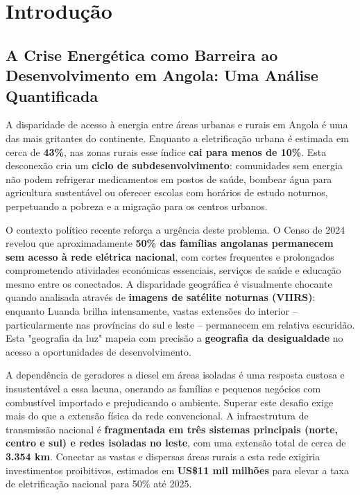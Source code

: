 \documentclass[12pt, a4paper]{article}
\begin{document}
\newpage

\tableofcontents
\newpage

\section{Introdução}

\subsection{A Crise Energética como Barreira ao Desenvolvimento em Angola: Uma Análise Quantificada}

A disparidade de acesso à energia entre áreas urbanas e rurais em Angola é uma das mais gritantes do continente. Enquanto a eletrificação urbana é estimada em cerca de \textbf{43\%}, nas zonas rurais esse índice \textbf{cai para menos de 10\%}. Esta desconexão cria um \textbf{ciclo de subdesenvolvimento}: comunidades sem energia não podem refrigerar medicamentos em postos de saúde, bombear água para agricultura sustentável ou oferecer escolas com horários de estudo noturnos, perpetuando a pobreza e a migração para os centros urbanos.

O contexto político recente reforça a urgência deste problema. O Censo de 2024 revelou que aproximadamente \textbf{50\% das famílias angolanas permanecem sem acesso à rede elétrica nacional}, com cortes frequentes e prolongados comprometendo atividades económicas essenciais, serviços de saúde e educação mesmo entre os conectados. A disparidade geográfica é visualmente chocante quando analisada através de \textbf{imagens de satélite noturnas (VIIRS)}: enquanto Luanda brilha intensamente, vastas extensões do interior – particularmente nas províncias do sul e leste – permanecem em relativa escuridão. Esta "geografia da luz" mapeia com precisão a \textbf{geografia da desigualdade} no acesso a oportunidades de desenvolvimento.

A dependência de geradores a diesel em áreas isoladas é uma resposta custosa e insustentável a essa lacuna, onerando as famílias e pequenos negócios com combustível importado e prejudicando o ambiente. Superar este desafio exige mais do que a extensão física da rede convencional. A infraestrutura de transmissão nacional é \textbf{fragmentada em três sistemas principais (norte, centro e sul) e redes isoladas no leste}, com uma extensão total de cerca de \textbf{3.354 km}. Conectar as vastas e dispersas áreas rurais a esta rede exigiria investimentos proibitivos, estimados em \textbf{US\$11 mil milhões} para elevar a taxa de eletrificação nacional para 50\% até 2025.
\end{document}
